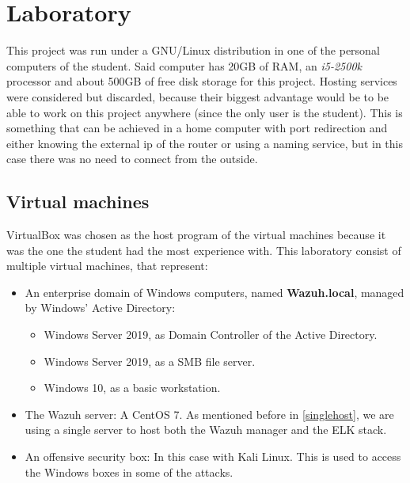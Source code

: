 \section{Laboratory}
This project was run under a GNU/Linux distribution in one of the personal computers of the student.
Said computer has 20GB of RAM, an \textit{i5-2500k} processor and about 500GB of free disk storage for this project.
\linej
\linej
Hosting services were considered but discarded, because their biggest advantage would be to be able to work on this project anywhere (since the only user is the student). This is something that can be achieved in a home computer with port redirection and either knowing the external ip of the router or using a naming service, but in this case there was no need to connect from the outside.

\subsection{Virtual machines}
VirtualBox was chosen as the host program of the virtual machines because it was the one the student had the most experience with.
\linej
This laboratory consist of multiple virtual machines, that represent:
\begin{itemize}
	\item An enterprise domain of Windows computers, named \textbf{Wazuh.local}, managed by Windows' Active Directory:
		\begin{itemize}
			\item Windows Server 2019, as Domain Controller of the Active Directory.
			\item Windows Server 2019, as a SMB file server.
			\item Windows 10, as a basic workstation.
		\end{itemize}
	\item The Wazuh server: A CentOS 7. As mentioned before in \ref{singlehost}, we are using a single server to host both the Wazuh manager and the ELK stack.
	\item An offensive security box: In this case with Kali Linux. This is used to access the Windows boxes in some of the attacks.
\end{itemize}

